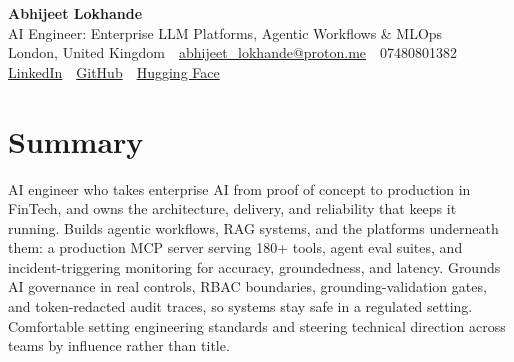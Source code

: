 \documentclass[10pt,a4paper]{article}
\newcommand{\sep}{\,\textcolor{accent!60}{\textbar}\,}
\begin{document}
\begin{center}
  {\fontsize{24}{26}\selectfont\bfseries Abhijeet Lokhande}\\[3pt]
  {\color{accent}\large AI Engineer: Enterprise LLM Platforms, Agentic Workflows \& MLOps}\\[5pt]
  {\small
    London, United Kingdom \sep
    \href{mailto:abhijeet_lokhande@proton.me}{abhijeet\_lokhande@proton.me} \sep
    07480801382 \\[2pt]
    \href{https://www.linkedin.com/in/ablds/}{LinkedIn} \sep
    \href{https://github.com/abhijeetscode}{GitHub} \sep
    \href{https://huggingface.co/ab-ai}{Hugging Face}
  }
\end{center}
\vspace{2pt}

\section{Summary}
AI engineer who takes enterprise AI from proof of concept to production in FinTech, and owns the architecture, delivery, and reliability that keeps it running. Builds agentic workflows, RAG systems, and the platforms underneath them: a production MCP server serving 180+ tools, agent eval suites, and incident-triggering monitoring for accuracy, groundedness, and latency. Grounds AI governance in real controls, RBAC boundaries, grounding-validation gates, and token-redacted audit traces, so systems stay safe in a regulated setting. Comfortable setting engineering standards and steering technical direction across teams by influence rather than title.

\end{document}
